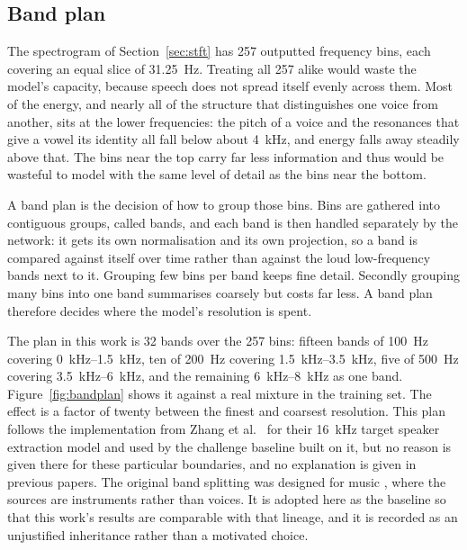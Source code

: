 
\subsection{Band plan}
\label{sec:bandplan}

The spectrogram of Section~\ref{sec:stft} has 257 outputted frequency bins, each covering an equal slice of \SI{31.25}{\Hz}. Treating all 257 alike would waste the model's capacity, because speech does not spread itself evenly across them. Most of the energy, and nearly all of the structure that distinguishes one voice from another, sits at the lower frequencies: the pitch of a voice and the resonances that give a vowel its identity all fall below about \SI{4}{\kHz}, and energy falls away steadily above that. The bins near the top carry far less information and thus would be wasteful to model with the same level of detail as the bins near the bottom.  

A band plan is the decision of how to group those bins. Bins are gathered into contiguous groups, called bands, and each band is then handled separately by the network: it gets its own normalisation and its own projection, so a band is compared against itself over time rather than against the loud low-frequency bands next to it. Grouping few bins per band keeps fine detail. Secondly grouping many bins into one band summarises coarsely but costs far less. A band plan therefore decides where the model's resolution is spent. 

The plan in this work is 32 bands over the 257 bins: fifteen bands of \SI{100}{\Hz} covering \SIrange{0}{1.5}{\kHz}, ten of \SI{200}{\Hz} covering \SIrange{1.5}{3.5}{\kHz}, five of \SI{500}{\Hz} covering \SIrange{3.5}{6}{\kHz}, and the remaining \SIrange{6}{8}{\kHz} as one band. Figure~\ref{fig:bandplan} shows it against a real mixture in the training set. The effect is a factor of twenty between the finest and coarsest resolution. This plan follows the implementation from Zhang et al.\ \cite{zhang2025multi} for their \SI{16}{\kHz} target speaker extraction model and used by the challenge baseline built on it, but no reason is given there for these particular boundaries, and no explanation is given in previous papers. The original band splitting was designed for music \cite{luo2023music}, where the sources are instruments rather than voices. It is adopted here as the baseline so that this work's results are comparable with that lineage, and it is recorded as an unjustified inheritance rather than a motivated choice.

